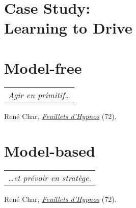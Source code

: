 


\part[Case Study: Learning to Drive]{Case Study:\\Learning to Drive}
\label{part:1}




\part{Model-free}
\label{part:2}

\vspace*{2cm}
\begin{flushright}
	\begin{tabular}{@{}l@{}}
		\emph{Agir en primitif\dots}\\
	\end{tabular}
	
	René Char, \href{https://eleurent.github.io/sisyphe/texts/feuillets-d-hypnos.html}{\emph{Feuillets d'Hypnos}} {\small (72)}.
\end{flushright}




\part{Model-based}
\label{part:3}

\vspace*{2cm}
\begin{flushright}
	\begin{tabular}{@{}l@{}}
		\emph{\dots et prévoir en stratège.}\\
	\end{tabular}
	
	René Char, \href{https://eleurent.github.io/sisyphe/texts/feuillets-d-hypnos.html}{\emph{Feuillets d'Hypnos}} {\small (72)}.
\end{flushright}




